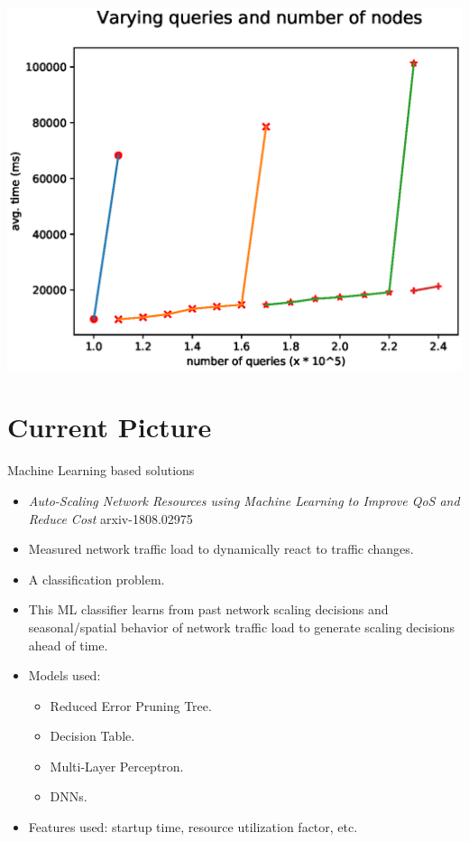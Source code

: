 \documentclass{beamer}
\begin{document}
\begin{frame}
    \includegraphics[width=\textwidth]{fig8.eps}
\end{frame}

\section{Current Picture}

\begin{frame}{Machine Learning based solutions}
\begin{itemize}
    \pause\item \textit{Auto-Scaling Network Resources using Machine Learning to Improve QoS and Reduce Cost} arxiv-1808.02975
    \pause\item Measured network traffic load to dynamically react to traffic changes.
    \pause\item A classification problem.
    \pause\item This ML classifier learns from past network scaling decisions and seasonal/spatial
            behavior of network traffic load to generate scaling decisions ahead of time. 
    \pause\item Models used:
        \begin{itemize}
                \pause\item Reduced Error Pruning Tree.
                \pause\item Decision Table.
                \pause\item Multi-Layer Perceptron.
                \pause\item DNNs.
        \end{itemize}
    \pause\item Features used:  startup time, resource utilization factor, etc.
\end{itemize}
\end{frame}
\end{document}
